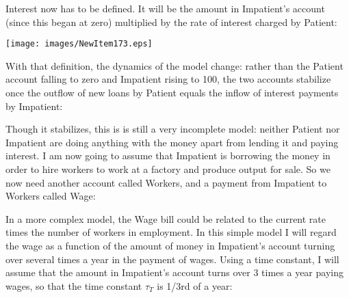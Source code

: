 Interest now has to be defined. It will be the amount in Impatient's
account (since this began at zero) multiplied by the rate of interest
charged by Patient:

\begin{center}
\texttt{[image: images/NewItem173.eps]}
\end{center}

With that definition, the dynamics of the model change: rather than
the Patient account falling to zero and Impatient rising to 100, the
two accounts stabilize once the outflow of new loans by Patient equals
the inflow of interest payments by Impatient:

\begin{center}
\end{center}

Though it stabilizes, this is is still a very incomplete model:
neither Patient nor Impatient are doing anything with the money apart
from lending it and paying interest. I am now going to assume that
Impatient is borrowing the money in order to hire workers to work at a
factory and produce output for sale. So we now need another account
called Workers, and a payment from Impatient to Workers called Wage:

\begin{center}
\end{center}

In a more complex model, the Wage bill could be related to the current
rate times the number of workers in employment. In this simple model I
will regard the wage as a function of the amount of money in
Impatient's account turning over several times a year in the payment
of wages. Using a time constant, I will assume that the amount in
Impatient's account turns over 3 times a year paying wages, so that
the time constant $\tau_T$ is 1/3rd of a year:

